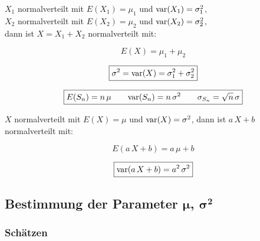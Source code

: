 
\vspace{0.1cm}
$X_1$ normalverteilt mit $E(X_1) = \mu_1$ und $\mathrm{var}(X_1) = \sigma_1^2$, \\
$X_2$ normalverteilt mit $E(X_2) = \mu_2$ und $\mathrm{var}(X_2) = \sigma_2^2$, \\
dann ist $X = X_1 + X_2$ normalverteilt mit:

\vspace{0.2cm}

\begin{minipage}[c]{0.48\columnwidth}
	$$ \boxed{ E(X) = \mu_1 + \mu_2 } $$
\end{minipage}
\hfill
\begin{minipage}[c]{0.48\columnwidth}
	$$ \boxed{ \sigma^2 = \mathrm{var}(X)  = \sigma_1^2 + \sigma_2^2 } $$
\end{minipage}

\vspace{0.2cm}

$$ \boxed{ E(S_n) = n\,\mu \qquad \mathrm{var}(S_n) = n\,\sigma^2 \qquad \sigma_{S_n} = \sqrt{n}\,\sigma } $$

\vspace{0.2cm}


\vspace{0.1cm}

$X$ normalverteilt mit $E(X) = \mu$ und $\mathrm{var}(X) = \sigma^2$, dann ist $a \, X + b$ normalverteilt mit:

\vspace{0.2cm}

\begin{minipage}[c]{0.48\columnwidth}
	$$ \boxed{ E(a \, X + b) = a \, \mu +  b } $$
\end{minipage}
\hfill
\begin{minipage}[c]{0.48\columnwidth}
	$$ \boxed{ \mathrm{var}(a \, X + b)  = a^2 \, \sigma^2 }  $$
\end{minipage}



\subsection[Bestimmung der Parameter]{Bestimmung der Parameter $\bm{\mu}$, $\bm{\sigma^2}$}
\label{sec:parameter-schaetzen}

\subsubsection{Schätzen}

